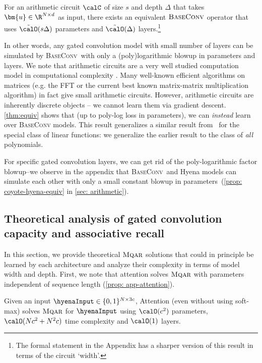 \begin{theorem}
    \label{thm:equiv}
    For an arithmetic circuit $\calC$ of size $s$ and depth $\Delta$ that takes $\bm{u} \in \R^{N \times d}$ as input, there exists an equivalent ${\textsc{BaseConv}}$ operator that uses $\tilde{\calO}(s \Delta)$ parameters and $\tilde{\calO}(\Delta)$ layers.\footnote{The formal statement in the Appendix has a sharper version of this result in terms of the circuit `width'.}
\end{theorem}

In other words, any gated convolution model with small number of layers can be simulated by \textsc{BaseConv}\ with only a (poly)logarithmic blowup in parameters and layers. We note that arithmetic circuits are a very well studied computation model in computational complexity \cite{bürgisser1996algebraic}. Many well-known efficient algorithms on matrices (e.g. the FFT or the current best known matrix-matrix multiplication algorithm) in fact give small arithmetic circuits. However, arithmetic circuits are inherently discrete objects -- we cannot learn them via gradient descent. \ref{thm:equiv} shows that (up to poly-log loss in parameters), we can \textit{instead} learn over {\textsc{BaseConv}} models. This result generalizes a similar result from~\cite{dao2020kaleidoscope} for the special class of linear functions: we generalize the earlier result to the class of {\em all} polynomials.

For specific gated convolution layers, we can get rid of the poly-logarithmic factor blowup--we observe in the appendix that \textsc{BaseConv}\ and Hyena models can simulate each other with only a small constant blowup in parameters~(\ref{prop: coyote-hyena-equiv} in \ref{sec: arithmetic}).

\subsection{Theoretical analysis of gated convolution capacity and associative recall}
\label{sec:theory-capacity}

In this section, we provide theoretical ${\textsc{Mqar}}$ solutions that could in principle be learned by each architecture and analyze their complexity in terms of model width and depth. First, we note that attention solves $\textsc{Mqar}$ with parameters independent of sequence length (\ref{prop: app-attention}).

\begin{proposition}[Attention]
\label{prop: attention-ar} Given an input $\hyenaInput\in \{0,1\}^{N \times 3c}$, Attention (even without using soft-max) solves $\textsc{Mqar}$ for $\hyenaInput$ using {${\calO}(c^2)$} parameters, $\calO(Nc^2 + N^2c)$ time complexity and ${\calO}(1)$ layers.
\end{proposition}

